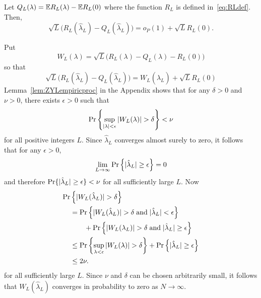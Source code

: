 \documentclass[journal]{IEEEtran}
\begin{document}
\begin{lemma}\label{lem:empiricprocc} Let $Q_L(\lambda) = {\mathbb E} R_L(\lambda) - {\mathbb E} R_L(0)$ where the function $R_L$ is defined in~\eqref{eq:RLdef}.  Then,
\[
\sqrt{L}\big( R_L(\hat{\lambda}_L) - Q_L(\hat{\lambda}_L) \big) = o_P(1) + \sqrt{L} R_L(0).
\]
\end{lemma}
\begin{IEEEproof}
Put 
\begin{equation}\label{eq:WLdef}
W_L(\lambda) = \sqrt{L}\big( R_L(\lambda) - Q_L(\lambda) - R_L(0) \big)
\end{equation}
so that
\[
\sqrt{L}\big( R_L(\hat{\lambda}_L) - Q_L(\hat{\lambda}_L) \big) = W_L(\hat{\lambda}_L) + \sqrt{L} R_L(0)
\]
Lemma~\ref{lem:ZYLempiricproc} in the Appendix shows that for any $\delta > 0$ and $\nu > 0$, there exists $\epsilon > 0$ such that
\[
\Pr\left\{ \sup_{{\vert \lambda \vert}<\epsilon}{\vert W_L(\lambda) \vert} > \delta  \right\} < \nu
\]
for all positive integers $L$.  Since $\hat{\lambda}_L$ converges almost surely to zero, it follows that for any $\epsilon > 0$,
\[
\lim_{L\rightarrow\infty}{\operatorname{Pr}}\left\{ {\vert \hat{\lambda}_L \vert} \geq \epsilon \right\} = 0
\] 
and therefore ${\operatorname{Pr}}\{ {\vert \hat{\lambda}_L \vert} \geq \epsilon \} < \nu$ for all sufficiently large $L$.  Now
\begin{align*}
  {\operatorname{Pr}}&\left\{{\vert  W_L(\hat{\lambda}_L)  \vert} > \delta \right\} \\
&= {\operatorname{Pr}}\left\{ {\vert W_L(\hat{\lambda}_L) \vert} > \delta \;\text{and} \; {\vert \hat{\lambda}_L \vert} < \epsilon \right\} \\
&\hspace{0.7cm} + {\operatorname{Pr}}\left\{ {\vert W_L(\lambda_L) \vert} > \delta  \;\text{and} \; {\vert \hat{\lambda}_L \vert} \geq \epsilon \right\} \\
&\leq {\operatorname{Pr}}\left\{  \sup_{\lambda < \epsilon} {\vert  W_L(\lambda)  \vert} > \delta \right\} + {\operatorname{Pr}}\left\{ {\vert \hat{\lambda}_L \vert} \geq \epsilon \right\} \\
&\leq 2\nu.
\end{align*}
for all sufficiently large $L$.  Since $\nu$ and $\delta$ can be chosen arbitrarily small, it follows that $W_L(\hat{\lambda}_L)$ converges in probability to zero as $N\rightarrow\infty$.
\end{IEEEproof}
\end{document}
